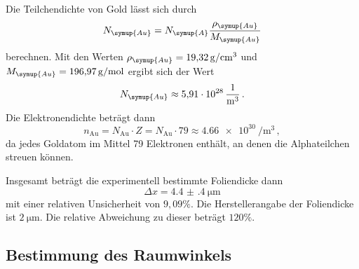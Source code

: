 Die Teilchendichte von Gold lässt sich durch
\begin{equation*}
  N_{\symup{Au}} = N_{\symup{A}} \frac{\rho_{\symup{Au}}}{M_{\symup{Au}}}
\end{equation*}
berechnen. Mit den Werten $\rho_{\symup{Au}}=\SI{19.32}{\gram\per\cubic\centi\metre}$ \cite{rho}
und ${M_{\symup{Au}}}=\SI{196.97}{\gram\per\mol}$ \cite{molmasse}
ergibt sich der Wert
\begin{equation*}
  N_{\symup{Au}} \approx \SI{5.91e28}{\per\cubic\metre}\,.
\end{equation*}
Die Elektronendichte beträgt dann
\begin{equation}
  n_\text{Au} = N_\text{Au} \cdot Z = N_\text{Au} \cdot 79 \approx \SI{4.66e30}{\per\cubic\metre}\,,
\end{equation}
da jedes Goldatom im Mittel 79 Elektronen enthält, an denen die Alphateilchen streuen können.

Insgesamt beträgt die experimentell bestimmte Foliendicke dann
\begin{equation*}
  \Delta x = \SI{4.4(4)}{\micro\metre}
\end{equation*}
mit einer relativen Unsicherheit von $9{,}09\%$.
Die Herstellerangabe der Foliendicke ist $\SI{2}{\micro\meter}$. Die relative Abweichung zu dieser beträgt $120\%$.

\subsection{Bestimmung des Raumwinkels}
\label{subsec:raumwinkel}

